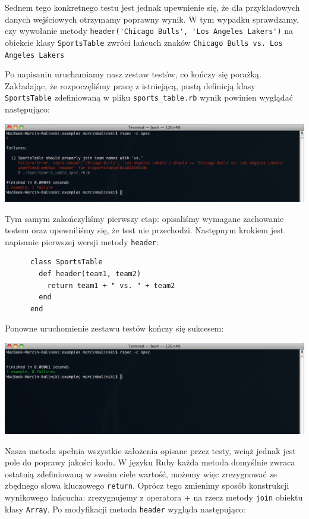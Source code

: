     Sednem tego konkretnego testu jest jednak upewnienie się, że dla przykładowych danych wejściowych otrzymamy poprawny wynik. W tym wypadku sprawdzamy, czy wywołanie metody \verb+header('Chicago Bulls', 'Los Angeles Lakers')+ na obiekcie klasy \verb+SportsTable+ zwróci łańcuch znaków \verb+Chicago Bulls vs. Los Angeles Lakers+
    
    Po napisaniu uruchamiamy nasz zestaw testów, co kończy się porażką. Zakładając, że rozpoczęliśmy pracę z istniejącą, pustą definicją klasy \verb+SportsTable+ zdefiniowaną w pliku \verb+sports_table.rb+ wynik powinien wyglądać następująco:

    \includegraphics[width=160mm]{images/example1_failure.png}
    
    Tym samym zakończyliśmy pierwszy etap: opisaliśmy wymagane zachowanie testem oraz upewniliśmy się, że test nie przechodzi. Następnym krokiem jest napisanie pierwszej wersji metody \verb+header+:
    
    \begin{verbatim}
      class SportsTable
        def header(team1, team2)
          return team1 + " vs. " + team2
        end
      end
    \end{verbatim}
    
    Ponowne uruchomienie zestawu testów kończy się sukcesem:
    
    \includegraphics[width=160mm]{images/example1_success.png}
    
    Nasza metoda spełnia wszystkie założenia opisane przez testy, wciąż jednak jest pole do poprawy jakości kodu. W języku Ruby każda metoda domyślnie zwraca ostatnią zdefiniowaną w swoim ciele wartość, możemy więc zrezygnować ze zbędnego słowa kluczowego \verb+return+. Oprócz tego zmienimy sposób konstrukcji wynikowego łańcucha: zrezygnujemy z operatora \verb+++ na rzecz metody \verb+join+ obiektu klasy \verb+Array+. Po modyfikacji metoda \verb+header+ wygląda następująco:
    

